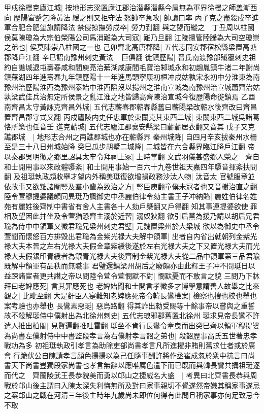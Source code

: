 甲戍徐槾克廬江城|{
	按地形志梁置廬江郡治潜縣潜縣今属無為軍界徐槾之師盖漸西向}
歷陽窘蹙乞降黃法緩之則又拒守法怒帥卒急攻|{
	帥讀曰率}
丙子克之盡殺戍卒進軍合肥合肥望旗請降法禁侵掠撫勞戍卒|{
	勞力到翻}
與之盟而縱之　丁丑周以柱國侯莫陳瓊為大宗伯榮陽公司馬消難為大司寇|{
	難乃旦翻}
江陵摠管陸騰為大司空瓊崇之弟也|{
	侯莫陳崇八柱國之一也}
己卯齊北高唐郡降|{
	五代志同安郡宿松縣梁置高塘郡降戶江翻}
辛巳詔南豫州刺史黃法|{
	巨俱翻}
徙鎮歷陽|{
	晉氏南渡豫部殱覆刺史祖約自譙城退屯壽春咸和間庾亮治蕪湖咸康間毛寶治邾城永和初趙胤鎮牛渚二年謝尚鎮蕪湖四年進壽春九年鎮歷陽十一年進馬頭寧康初桓冲戍姑孰宋永初中分淮東為南豫州治歷陽淮西為豫州泰始中淮西䧟沒以揚州之淮南宣城為南豫州治宣城蕭齊治姑孰梁武佳兵治無定所侯景之亂江淮之地皆歸高齊陳治宣城今復歷陽命徙鎮焉}
乙酉南齊昌太守黃詠克齊昌外城|{
	五代志蘄春郡蘄春縣舊曰蘄陽梁改蘄水後齊改曰齊昌置齊昌郡守式又翻}
丙戍廬陵内史任忠軍於東關克其東西二城|{
	東關東西二城吳諸葛恪所築也任音壬}
進克蘄城|{
	五代志廬江郡襄安縣梁曰蘄蘄居衣翻又音其}
戊子又克譙郡城　|{
	地形志合州之南譙郡城也亦在蘄縣界}
秦州城降|{
	自四月辛亥拔秦州水柵至是三十八日州城始降}
癸巳瓜步胡墅二城降|{
	二城皆在六合縣界臨江降戶江翻}
帝以秦郡吳明徹之鄉里詔具太牢令拜祠上冢|{
	上時掌翻}
文武羽儀甚盛鄉人榮之　齊自和士開用事以來政體隳紊|{
	和士開用事始一百六十九卷世祖天嘉四年隳音揮紊扶問翻}
及祖珽執政頗收舉才望内外稱美珽復欲增損政務沙汰人物|{
	汰音太}
官號服章並依故事又欲黜諸閹豎及羣小輩為致治之方|{
	豎臣庾翻童僕未冠者也又音樹治直之翻}
陸令萱穆提婆議頗同異珽乃諷御史中丞麗伯律令劾主書王子冲納賂|{
	麗姓伯律名姓苑有麗姓後齊制中書省有舍人主書各十人劾戶槩翻又戶得翻}
知其事連提婆欲使罪相及望因此并坐及令萱猶恐齊主溺於近習|{
	溺奴狄翻}
欲引后黨為援乃請以胡后兄君瑜為侍中中領軍又徵君瑜兄梁州刺史君璧|{
	元魏置梁州於大梁城}
欲以為御史中丞令萱聞而懷怒百方排毁出君瑜為金紫光禄大夫解中領軍|{
	出者自内省出就朝列金紫光禄大夫本晉之左右光禄大夫假金章紫綬後遂於左右光禄大夫之下又置光禄大夫而光禄大夫假銀印青綬者為銀青光禄大夫後齊制金紫光禄大夫從二品中領軍第三品君瑜既解中領軍有品秩而無職事}
君璧還鎮梁州胡后之廢頗亦由此釋王子冲不問珽日以益踈諸宦者更共譖之帝以問陸令萱令萱憫默不對|{
	憫默憂而不敢言之貌}
三問乃下牀拜曰老婢應死|{
	言其罪應死也}
老婢始聞和士開言孝徵多才博學意謂善人故舉之比來觀之|{
	比毗至翻}
大是姧臣人寔難知老婢應死帝令韓長鸞檢案|{
	檢察也搜也校也舉也案考驗也亦舉也}
長鸞素惡珽|{
	惡烏路翻}
得其詐出勑受賜等十餘事帝以嘗與之重誓故不殺解珽侍中僕射出為北徐州刺史|{
	五代志琅邪郡舊置北徐州}
珽求見帝長鸞不許遣人推出柏閤|{
	見賢遍翻推吐雷翻}
珽坐不肯行長鸞令牽曳而出癸巳齊以領軍穆提婆為尚書左僕射侍中中書監段孝言為右僕射孝言韶之弟也|{
	段韶歷事高氏五世著忠孝戰功為多}
初祖珽執政引孝言為助除吏部尚書孝言凡所進擢非賄則舊求仕者或於廣會行跪伏公自陳請孝言顔色揚揚以為己任隨事酬許將作丞崔成忽於衆中抗言曰尚書天下尚書豈獨段家尚書也孝言無辭以應唯厲色遣下而已既而與韓長鸞共搆祖珽逐而代之　齊蘭陵武王長恭貌美而勇以邙山之捷威名大盛　|{
	考異曰北齊書長恭與周戰於邙山後主謂曰入陳太深失利悔無所及對曰家事親切不覺遂然帝嫌其稱家事遂忌之案邙山之戰在河清三年後主時年九歲尚未即位何得有此問且稱家事亦何足致忌今不取}
